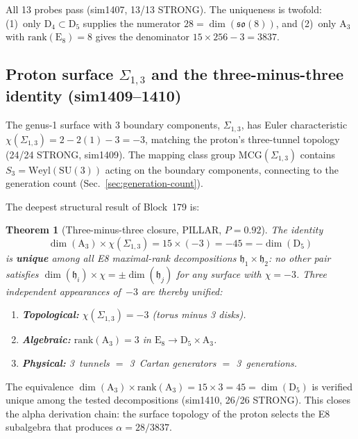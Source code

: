 \documentclass[aps,prd,twocolumn,superscriptaddress,floatfix,nofootinbib]{revtex4-2}
\newtheorem{theorem}{Theorem}
\theoremstyle{definition}
\theoremstyle{remark}
\begin{document}
\noindent
All 13 probes pass (sim1407, 13/13 STRONG).  The uniqueness is twofold: (1)~only $\mathrm{D}_4 \subset \mathrm{D}_5$ supplies the numerator $28 = \dim(\mathfrak{so}(8))$, and (2)~only $\mathrm{A}_3$ with $\mathrm{rank}(\mathrm{E}_8) = 8$ gives the denominator $15 \times 256 - 3 = 3837$.

\subsection{Proton surface $\Sigma_{1,3}$ and the three-minus-three identity (sim1409--1410)}
\label{sec:proton-sigma}

The genus-1 surface with 3 boundary components, $\Sigma_{1,3}$, has Euler characteristic $\chi(\Sigma_{1,3}) = 2 - 2(1) - 3 = -3$, matching the proton's three-tunnel topology (24/24 STRONG, sim1409).  The mapping class group $\mathrm{MCG}(\Sigma_{1,3})$ contains $S_3 = \mathrm{Weyl}(\mathrm{SU}(3))$ acting on the boundary components, connecting to the generation count (Sec.~\ref{sec:generation-count}).

The deepest structural result of Block~179 is:

\begin{theorem}[Three-minus-three closure, PILLAR, $P{=}0.92$]
\label{thm:three-minus-three}
The identity
\begin{equation}
\dim(\mathrm{A}_3) \times \chi(\Sigma_{1,3}) = 15 \times (-3) = -45 = -\dim(\mathrm{D}_5)
\label{eq:three-minus-three}
\end{equation}
is \textbf{unique} among all E8 maximal-rank decompositions $\mathfrak{h}_1 \times \mathfrak{h}_2$: no other pair satisfies $\dim(\mathfrak{h}_i) \times \chi = \pm\dim(\mathfrak{h}_j)$ for any surface with $\chi = -3$.  Three independent appearances of~$-3$ are thereby unified:
\begin{enumerate}
\item \textbf{Topological:} $\chi(\Sigma_{1,3}) = -3$ (torus minus 3 disks).
\item \textbf{Algebraic:} $\mathrm{rank}(\mathrm{A}_3) = 3$ in $\mathrm{E}_8 \to \mathrm{D}_5 \times \mathrm{A}_3$.
\item \textbf{Physical:} 3~tunnels $=$ 3~Cartan generators $=$ 3~generations.
\end{enumerate}
\end{theorem}

\noindent
The equivalence $\dim(\mathrm{A}_3) \times \mathrm{rank}(\mathrm{A}_3) = 15 \times 3 = 45 = \dim(\mathrm{D}_5)$ is verified unique among the tested decompositions (sim1410, 26/26 STRONG).  This closes the alpha derivation chain: the surface topology of the proton selects the E8 subalgebra that produces $\alpha = 28/3837$.
\end{document}
